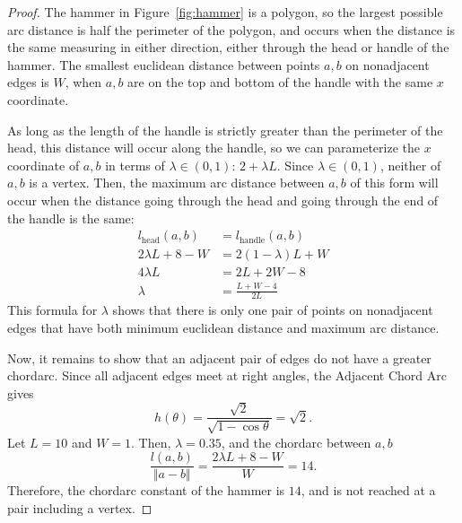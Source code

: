 \documentclass{article}
\begin{document}
\begin{proof}
	The hammer in Figure~\ref{fig:hammer} is a polygon, so the largest possible arc distance is half
	the perimeter of the polygon, and occurs when the distance is the same measuring in either
	direction, either through the head or handle of the hammer. The smallest euclidean distance between
	points $a,b$ on nonadjacent edges is $W$, when $a,b$ are on the top and bottom of the handle with
	the same $x$ coordinate.

	As long as the length of the handle is strictly greater than the perimeter of the head, this
	distance will occur along the handle, so we can parameterize the $x$ coordinate of $a,b$ in terms
	of $\lambda \in (0, 1)$: $2 + \lambda L$. Since $\lambda \in (0, 1)$, neither of $a,b$ is a vertex.
	Then, the maximum arc distance between $a,b$ of this form will occur when the distance going
	through the head and going through the end of the handle is the same:
	\begin{align*}
		l_\text{head}(a,b) &= l_\text{handle}(a,b) \\
		2 \lambda L + 8 - W &= 2 (1 - \lambda) L + W \\
		4 \lambda L &= 2L + 2W - 8 \\
		\lambda &= \frac{L + W - 4}{2L}
	\end{align*}
	This formula for $\lambda$ shows that there is only one pair of points on nonadjacent edges that
	have both minimum euclidean distance and maximum arc distance.

	Now, it remains to show that an adjacent pair of edges do not have a greater chordarc. Since all
	adjacent edges meet at right angles, the Adjacent Chord Arc gives
	\[ h(\theta) = \frac{\sqrt{2}}{\sqrt{1 - \cos\theta}} = \sqrt{2} \text{.} \]
	Let $L = 10$ and $W = 1$. Then, $\lambda = 0.35$, and the chordarc between $a,b$
	\[ \frac{l(a,b)}{\Vert a - b \Vert} = \frac{2 \lambda L + 8 - W}{W} = 14 \text{.}\]
	Therefore, the chordarc constant of the hammer is $14$, and is not reached at a pair including a
	vertex.
\end{proof}
\end{document}
